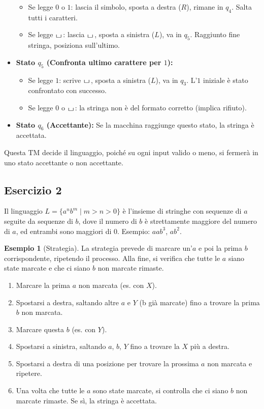 \documentclass[a4paper]{article}
\theoremstyle{definition} %
\newtheorem{example}{Esempio}
\newcommand{\blankS}{\ensuremath{\raisebox{-0.15ex}{\scalebox{1.3}[0.7]{$\sqcup$}}\mkern2mu}}
\begin{document}
\begin{itemize}
    \begin{itemize}
        \item Se legge $0$ o $1$: lascia il simbolo, sposta a destra ($R$), rimane in $q_4$. Salta tutti i caratteri.
        \item Se legge \blankS: lascia \blankS, sposta a sinistra ($L$), va in $q_5$. Raggiunto fine stringa, posiziona sull'ultimo.
    \end{itemize}
    \item \textbf{Stato $q_5$ (Confronta ultimo carattere per $1$):}
    \begin{itemize}
        \item Se legge $1$: scrive \blankS, sposta a sinistra ($L$), va in $q_3$. L'$1$ iniziale è stato confrontato con successo.
        \item Se legge $0$ o \blankS: la stringa non è del formato corretto (implica rifiuto).
    \end{itemize}
    \item \textbf{Stato $q_6$ (Accettante):} Se la macchina raggiunge questo stato, la stringa è accettata.
\end{itemize}
Questa TM decide il linguaggio, poiché su ogni input valido o meno, si fermerà in uno stato accettante o non accettante.

\subsection{Esercizio 2}
Il linguaggio $L = \{a^n b^m \mid m > n > 0\}$ è l'insieme di stringhe con sequenze di $a$ seguite da sequenze di $b$, dove il numero di $b$ è strettamente maggiore del numero di $a$, ed entrambi sono maggiori di $0$. Esempio: $aab^{3}$, $ab^{2}$.

\begin{example}[Strategia]
La strategia prevede di marcare un'$a$ e poi la prima $b$ corrispondente, ripetendo il processo. Alla fine, si verifica che tutte le $a$ siano state marcate e che ci siano $b$ non marcate rimaste.
\begin{enumerate}
    \item Marcare la prima $a$ non marcata (es. con $X$).
    \item Spostarsi a destra, saltando altre $a$ e $Y$ (b già marcate) fino a trovare la prima $b$ non marcata.
    \item Marcare questa $b$ (es. con $Y$).
    \item Spostarsi a sinistra, saltando $a$, $b$, $Y$ fino a trovare la $X$ più a destra.
    \item Spostarsi a destra di una posizione per trovare la prossima $a$ non marcata e ripetere.
    \item Una volta che tutte le $a$ sono state marcate, si controlla che ci siano $b$ non marcate rimaste. Se sì, la stringa è accettata.
\end{enumerate}
\end{example}
\end{document}
